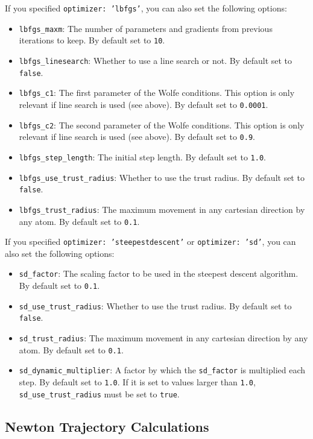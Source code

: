 \documentclass[]{tufte-book}
\begin{document}
If you specified \texttt{optimizer: 'lbfgs'}, you can also set the following options:
\begin{itemize}
\item \texttt{lbfgs\_maxm}: The number of parameters and gradients from previous iterations to keep. By default set to
\texttt{10}.
\item \texttt{lbfgs\_linesearch}: Whether to use a line search or not. By default set to \texttt{false}.
\item \texttt{lbfgs\_c1}: The first parameter of the Wolfe conditions. This option is only relevant if line search is
used (see above). By default set to \texttt{0.0001}.
\item \texttt{lbfgs\_c2}:  The second parameter of the Wolfe conditions. This option is only relevant if line search is
used (see above). By default set to \texttt{0.9}.
\item \texttt{lbfgs\_step\_length}: The initial step length. By default set to \texttt{1.0}.
\item \texttt{lbfgs\_use\_trust\_radius}: Whether to use the trust radius. By default set to \texttt{false}.
\item \texttt{lbfgs\_trust\_radius}: The maximum movement in any cartesian direction by any atom. By default set to \texttt{0.1}.
\end{itemize}

If you specified \texttt{optimizer: 'steepestdescent'} or \texttt{optimizer: 'sd'}, you can also set the following options:
\begin{itemize}
\item \texttt{sd\_factor}: The scaling factor to be used in the steepest descent algorithm. By default set to \texttt{0.1}.
\item \texttt{sd\_use\_trust\_radius}: Whether to use the trust radius. By default set to \texttt{false}.
\item \texttt{sd\_trust\_radius}: The maximum movement in any cartesian direction by any atom. By default set to \texttt{0.1}.
\item \texttt{sd\_dynamic\_multiplier}: A factor by which the \texttt{sd\_factor} is multiplied each step. By default set to \texttt{1.0}.
If it is set to values larger than \texttt{1.0}, \texttt{sd\_use\_trust\_radius} must be set to \texttt{true}.
\end{itemize}

\subsection{Newton Trajectory Calculations}
\end{document}
